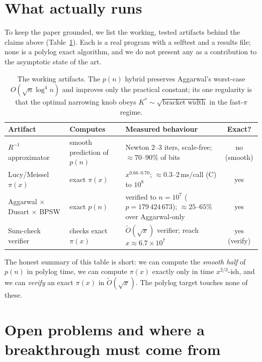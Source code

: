 \documentclass[11pt]{article}
\theoremstyle{plain}
\theoremstyle{definition}
\theoremstyle{remark}
\newcommand{\Rinv}{R^{-1}}
\newcommand{\Otil}{\widetilde{O}}
\begin{document}
\section{What actually runs}
\label{sec:artifacts}

To keep the paper grounded, we list the working, tested artifacts behind the
claims above (Table~\ref{tab:artifacts}). Each is a real program with a selftest
and a results file; none is a polylog exact algorithm, and we do not present any
as a contribution to the asymptotic state of the art.

\begin{table}[t]
\centering
\footnotesize
\begin{tabular}{@{}p{3.0cm} p{4.4cm} p{4.6cm} c@{}}
\toprule
\textbf{Artifact} & \textbf{Computes} & \textbf{Measured behaviour} & \textbf{Exact?}\\
\midrule
$\Rinv$ approximator & smooth prediction of $p(n)$ & Newton $2$--$3$ iters, scale-free; ${\approx}70$--$90\%$ of bits & no (smooth) \\
Lucy/Meissel $\pi(x)$ & exact $\pi(x)$ & $x^{0.66\text{--}0.70}$; ${\approx}0.3$--$2$\,ms/call (C) to $10^8$ & yes \\
Aggarwal $\times$ Dusart $\times$ BPSW & exact $p(n)$ & verified to $n=10^7$ ($p=179\,424\,673$); ${\approx}25$--$65\%$ over Aggarwal-only & yes \\
Sum-check verifier & checks exact $\pi(x)$ & $\Otil(\sqrt{x})$ verifier; reach $x\approx6.7\times10^7$ & yes (verify) \\
\bottomrule
\end{tabular}
\caption{The working artifacts. The $p(n)$ hybrid preserves Aggarwal's worst-case
$O(\sqrt{n}\log^4 n)$ and improves only the practical constant; its one regularity
is that the optimal narrowing knob obeys $K^\ast\sim\sqrt{\text{bracket width}}$ in
the fast-$\pi$ regime.}
\label{tab:artifacts}
\end{table}

The honest summary of this table is short: we can compute the \emph{smooth half}
of $p(n)$ in polylog time, we can compute $\pi(x)$ exactly only in time
$x^{2/3}$-ish, and we can \emph{verify} an exact $\pi(x)$ in $\Otil(\sqrt{x})$.
The polylog target touches none of these.

\section{Open problems and where a breakthrough must come from}
\label{sec:open}
\end{document}
